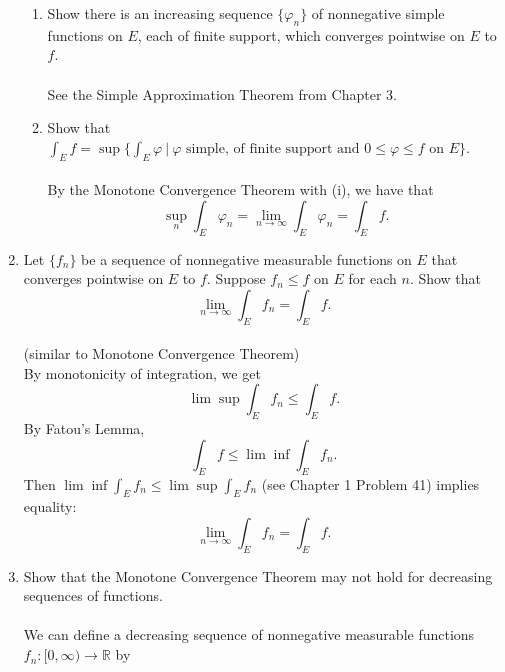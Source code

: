 \begin{enumerate}
    \begin{enumerate}[label=(\roman*),align=left]
        \item Show there is an increasing sequence $\{\varphi_n\}$ of nonnegative simple functions on $E$, each of finite support, which converges pointwise on $E$ to $f$.\\
        \\See the Simple Approximation Theorem from Chapter 3.
        \item Show that $\int_Ef=\sup\{\int_E\varphi\ |\ \varphi\text{ simple, of finite support and }0\le\varphi\le f\text{ on }E\}$.\\
        \\By the Monotone Convergence Theorem with (i), we have that
        \[
            \sup_n\int_E\varphi_n=\lim_{n\to\infty}\int_E\varphi_n=\int_Ef.
        \]
    \end{enumerate}
    \item Let $\{f_n\}$ be a sequence of nonnegative measurable functions on $E$ that converges pointwise on $E$ to $f$. Suppose $f_n\le f$ on $E$ for each $n$. Show that
    \[
        \lim_{n\to\infty}\int_Ef_n=\int_Ef.
    \]
    \\(similar to Monotone Convergence Theorem)
    \\By monotonicity of integration, we get
    \[
        \lim\sup\int_Ef_n\le \int_Ef.
    \]
    By Fatou's Lemma,
    \[
        \int_Ef\le\lim\inf\int_Ef_n.     
    \]
    Then $\lim\inf\int_Ef_n\le\lim\sup\int_Ef_n$ (see Chapter 1 Problem 41) implies equality:
    \[
        \lim_{n\to\infty}\int_Ef_n=\int_Ef.
    \]
    \item Show that the Monotone Convergence Theorem may not hold for decreasing sequences of functions.\\
    \\We can define a decreasing sequence of nonnegative measurable functions $f_n:[0,\infty)\to\mathbb{R}$ by

\end{enumerate}
